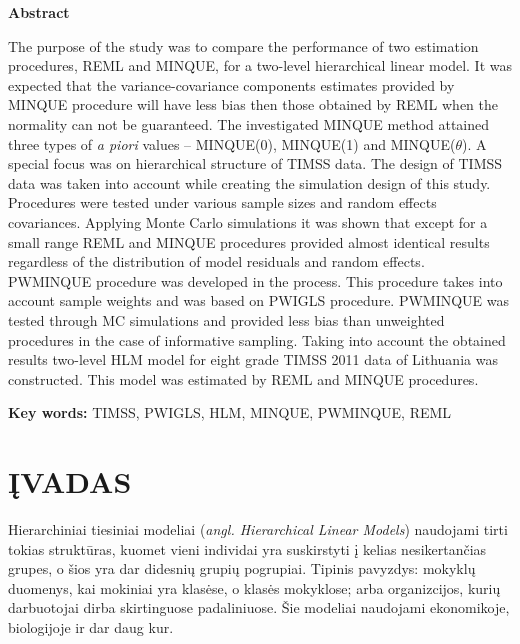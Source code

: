 \documentclass[11pt,a4paper]{article}
\begin{document}
\begin{small}
\vspace{2\baselineskip}
\begin{center}\textbf{Abstract}\end{center}

\indent The purpose of the study was to compare the performance of two estimation procedures, REML and  MINQUE, for a two-level hierarchical linear model. It was expected that the variance-covariance components estimates provided by MINQUE procedure will have less bias then those obtained by REML when the normality can not be guaranteed. The investigated MINQUE method attained three types of \textit{a piori} values -- MINQUE(0), MINQUE(1) and MINQUE($\theta$). A special focus was on hierarchical structure of TIMSS data. The design of TIMSS data was taken into account while creating the simulation design of this study. Procedures were tested under various sample sizes and random effects covariances. Applying Monte Carlo simulations it was shown that except for  a small range REML and MINQUE procedures provided almost identical results regardless of the distribution of model residuals and random effects. PWMINQUE procedure was developed in the process. This procedure takes into account sample weights and was based on  PWIGLS procedure. PWMINQUE was tested through MC simulations and provided less bias than unweighted procedures in the case of informative sampling. Taking into account the obtained results two-level HLM model for eight grade TIMSS 2011 data of Lithuania was constructed. This model was estimated by REML and MINQUE procedures.


\vspace{\baselineskip}

\noindent\textbf{Key words:}
TIMSS, PWIGLS, HLM, MINQUE, PWMINQUE, REML
\end{small}
\vspace{\baselineskip}


\newpage
\pagestyle{plain}
\renewcommand\contentsname{TURINYS}
\tableofcontents


\newpage
\section{ĮVADAS}

\indent Hierarchiniai tiesiniai modeliai (\textit{angl. Hierarchical Linear Models}) naudojami tirti tokias struktūras, kuomet vieni individai yra suskirstyti į kelias nesikertančias grupes, o šios yra dar didesnių grupių pogrupiai. Tipinis pavyzdys: mokyklų duomenys, kai mokiniai yra klasėse, o klasės mokyklose; arba organizcijos, kurių darbuotojai dirba skirtinguose padaliniuose. Šie modeliai naudojami ekonomikoje, biologijoje ir dar daug kur.\cite{cek}
\end{document}
